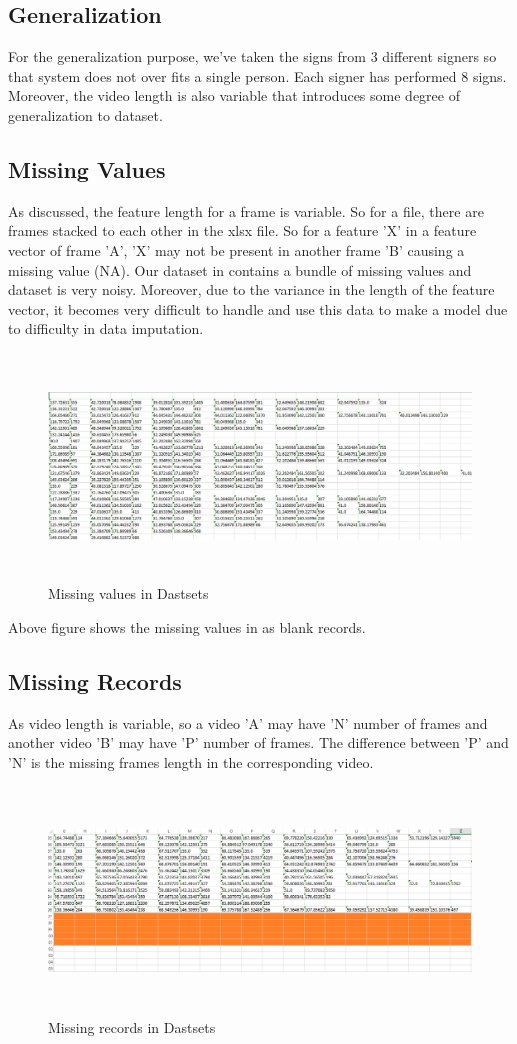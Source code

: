 \subsection{ Generalization }
For the generalization purpose, we've taken the signs from 3 different signers so that system does not over fits a single person. Each signer has performed 8 signs. Moreover, the video length is also variable that introduces some degree of generalization to dataset.
\subsection{ Missing Values }
As discussed, the feature length for a frame is variable. So for a file, there are frames stacked to each other in the xlsx file. So for a feature 'X' in a feature vector of frame 'A', 'X' may not be present in another frame 'B' causing a missing value (NA). Our dataset in contains a bundle of missing values and dataset is very noisy. Moreover, due to the variance in the length of the feature vector, it becomes very difficult to handle and use this data to make a model due to difficulty in data imputation.
\begin{figure}[!htb]
  \includegraphics[height=6cm,width=15cm]{ThesisFigs/dataset1}
  \caption{Missing values in Dastsets }\label{fig:dataset1}
\end{figure}
\newline Above figure shows the missing values in as blank records.
\clearpage
\subsection{ Missing Records }
As video length is variable, so a video 'A' may have 'N' number of frames and another video 'B' may have 'P' number of frames. The difference between 'P' and 'N' is the missing frames length in the corresponding video.
\begin{figure}[!htb]
  \includegraphics[height=6cm,width=15cm]{ThesisFigs/dataset2}
  \caption{Missing records in Dastsets }\label{fig:dataset2}
\end{figure}
